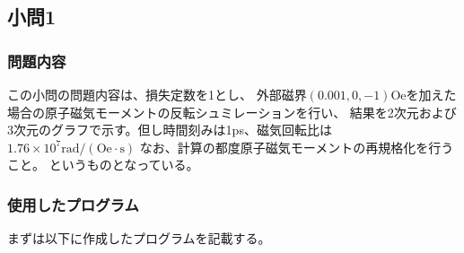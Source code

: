 \documentclass{jsarticle}
\begin{document}
\subsection{小問1}
\subsubsection{問題内容}
この小問の問題内容は、損失定数を1とし、
外部磁界$(0.001,0,-1)\mathrm{Oe}$を加えた場合の原子磁気モーメントの反転シュミレーションを行い、
結果を2次元および3次元のグラフで示す。但し時間刻みは1ps、磁気回転比は$1.76\times10^7\mathrm{rad/(Oe\cdot s)}$
なお、計算の都度原子磁気モーメントの再規格化を行うこと。
というものとなっている。

\subsubsection{使用したプログラム}
まずは以下に作成したプログラムを記載する。
\end{document}
